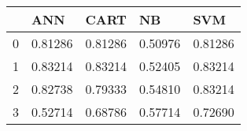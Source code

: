\begin{tabular}{|l|l|l|l|l|}
\toprule
{} &      ANN &     CART &       NB &      SVM \\
\midrule
0 &  0.81286 &  0.81286 &  0.50976 &  0.81286 \\
1 &  0.83214 &  0.83214 &  0.52405 &  0.83214 \\
2 &  0.82738 &  0.79333 &  0.54810 &  0.83214 \\
3 &  0.52714 &  0.68786 &  0.57714 &  0.72690 \\
\bottomrule
\end{tabular}
